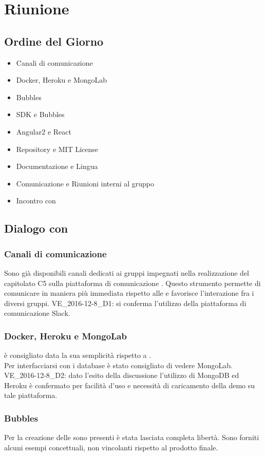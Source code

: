 \section{Riunione}
\subsection{Ordine del Giorno}
\begin{itemize}
	\item Canali di comunicazione
	\item Docker, Heroku e MongoLab
	\item Bubbles
	\item SDK e Bubbles
	\item Angular2 e React
	\item Repository e MIT License
	\item Documentazione e Lingua
	\item Comunicazione e Riunioni interni al gruppo \GroupName{}
	\item Incontro con \Proponente{}	
\end{itemize}

\subsection{Dialogo con \Proponente}
\subsubsection{Canali di comunicazione}
Sono già disponibili canali dedicati ai gruppi impegnati nella realizzazione del capitolato C5 sulla piattaforma di comunicazione . Questo strumento permette di comunicare in maniera più immediata rispetto alle \email{} e favorisce l'interazione fra i diversi gruppi. VE\_2016-12-8\_D1: si conferma l'utilizzo della piattaforma di comunicazione Slack.

\subsubsection{Docker, Heroku e MongoLab}
 è consigliato data la sua semplicità rispetto a .\\ 
Per interfacciarsi con i database è stato consigliato di vedere MongoLab.
VE\_2016-12-8\_D2: dato l'esito della discussione l'utilizzo di MongoDB ed Heroku è confermato per facilità d'uso e necessità di caricamento della demo su tale piattaforma. 

\subsubsection{Bubbles}
Per la creazione delle  sono presenti è stata lasciata completa libertà. Sono forniti alcuni esempi concettuali, non vincolanti rispetto al prodotto finale.

